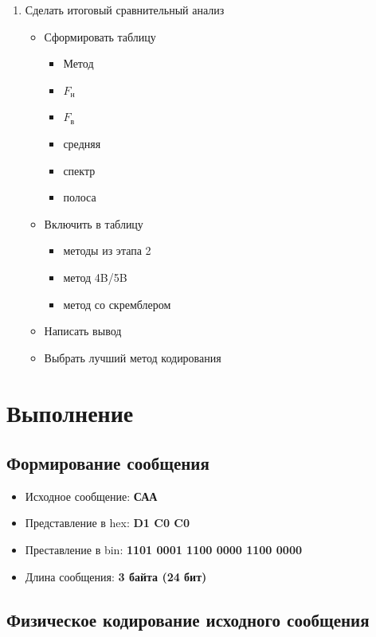 \documentclass[12pt,a4paper]{report}
\begin{document}
\begin{enumerate}
\begin{itemize}
\begin{itemize}
            \item полосу пропускания
        \end{itemize}
    \end{itemize}
    \item Сделать итоговый сравнительный анализ
    \begin{itemize}
        \item Сформировать таблицу
        \begin{itemize}
            \item Метод
            \item $F_\text{н}$
            \item $F_\text{в}$
            \item средняя
            \item спектр
            \item полоса
        \end{itemize}
        \item Включить в таблицу
        \begin{itemize}
            \item методы из этапа 2
            \item метод 4B/5B
            \item метод со скремблером
        \end{itemize}
        \item Написать вывод
        \item Выбрать лучший метод кодирования
    \end{itemize}
\end{enumerate}
\newpage
\section*{Выполнение}
\subsection*{Формирование сообщения}
\begin{itemize}
    \item Исходное сообщение: \textbf{САА}
    \item Представление в hex: \textbf{D1 C0 C0}
    \item Преставление в bin: \textbf{1101 0001 1100 0000 1100 0000}
    \item Длина сообщения: \textbf{3 байта (24 бит)}
\end{itemize}
\subsection*{Физическое кодирование исходного сообщения}
\end{document}

